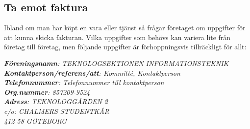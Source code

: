 \documentclass{article}
\begin{document}
\newpage
\subsection{Ta emot faktura}
Ibland om man har köpt en vara eller tjänst så frågar företaget om uppgifter för att kunna skicka fakturan. Vilka uppgifter som behövs kan variera lite från företag till företag, men följande uppgifter är förhoppningsvis tillräckligt för allt:
\begin{addmargin}[1cm]{0cm}
\textit{
\textbf{Föreningsnamn}: TEKNOLOGSEKTIONEN INFORMATIONSTEKNIK \\
\textbf{Kontaktperson/referens/att}: \lbrack Kommitté\rbrack, \lbrack Kontaktperson\rbrack \\
\textbf{Telefonnummer}: \lbrack Telefonnummer till kontaktperson \rbrack \\
\textbf{Org.nummer}: 857209-9524 \\
\textbf{Adress}:
TEKNOLOGGÅRDEN 2 \\
c/o: CHALMERS STUDENTKÅR \\
412 58 GÖTEBORG}
\end{addmargin}
\end{document}
